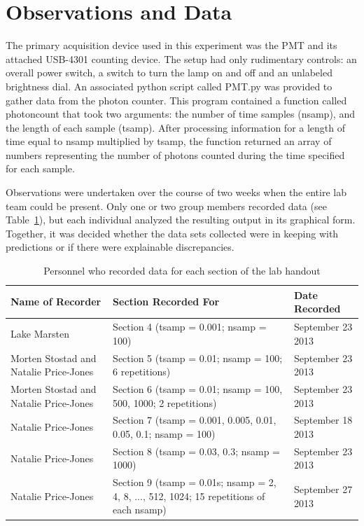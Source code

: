 \documentclass[a4paper,12pt]{article}
\begin{document}
\section{Observations and Data}
\label{sec:observations}

The primary acquisition device used in this experiment was the PMT and its attached USB-4301 counting device. The setup had only rudimentary controls: an overall power switch, a switch to turn the lamp on and off and an unlabeled brightness dial.  An associated python script called PMT.py was provided to gather data from the photon counter. This program contained a function called photoncount that took two arguments: the number of time samples (nsamp), and the length of each sample (tsamp). After processing information for a length of time equal to nsamp multiplied by tsamp, the function returned an array of numbers representing the number of photons counted during the time specified for each sample.

Observations were undertaken over the course of two weeks when the entire lab team could be present. Only one or two group members recorded data (see Table~\ref{tab:datatable}), but each individual analyzed the resulting output in its graphical form. Together, it was decided whether the data sets collected were in keeping with predictions or if there were explainable discrepancies.

\begin{center}
  \begin{table}[ht]
  \centering
  \begin{tabular}{p{2in}||p{2in}||l}
    Name of Recorder & Section Recorded For & Date Recorded\\
    \hline
    Lake Marsten & Section 4 (tsamp = 0.001; nsamp = 100) & September 23 2013\\
    \hline
    Morten Stostad and Natalie Price-Jones & Section 5 (tsamp = 0.01; nsamp = 100; 6 repetitions) & September 23 2013\\
    \hline
    Morten Stostad and Natalie Price-Jones & Section 6 (tsamp = 0.01; nsamp = 100, 500, 1000; 2 repetitions) & September 23 2013 \\
    \hline
    Natalie Price-Jones & Section 7 (tsamp = 0.001, 0.005, 0.01, 0.05, 0.1; nsamp = 100) & September 18 2013\\
    \hline
    Natalie Price-Jones & Section 8 (tsamp = 0.03, 0.3; nsamp = 1000) & September 23 2013\\
    \hline
    Natalie Price-Jones & Section 9 (tsamp = 0.01s; nsamp = 2, 4, 8, ..., 512, 1024; 15 repetitions of each nsamp)& September 27 2013\\
    \end{tabular}
    \caption{Personnel who recorded data for each section of the lab handout}
    \label{tab:datatable}
  \end{table}
\end{center}
\end{document}
